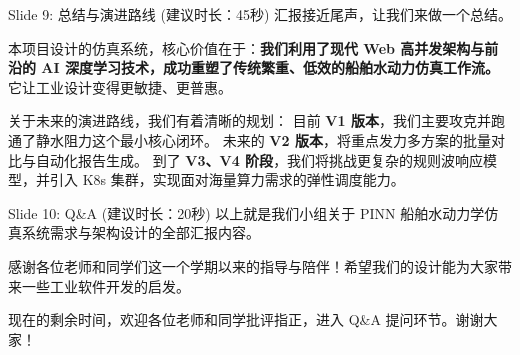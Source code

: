 \documentclass[UTF8,11pt]{ctexart}
\begin{document}
\begin{slidebox}{Slide 9: 总结与演进路线 (建议时长：45秒)}
汇报接近尾声，让我们来做一个总结。

本项目设计的仿真系统，核心价值在于：\textbf{我们利用了现代 Web 高并发架构与前沿的 AI 深度学习技术，成功重塑了传统繁重、低效的船舶水动力仿真工作流。} 它让工业设计变得更敏捷、更普惠。

关于未来的演进路线，我们有着清晰的规划：
目前 \textbf{V1 版本}，我们主要攻克并跑通了静水阻力这个最小核心闭环。
未来的 \textbf{V2 版本}，将重点发力多方案的批量对比与自动化报告生成。
到了 \textbf{V3、V4 阶段}，我们将挑战更复杂的规则波响应模型，并引入 K8s 集群，实现面对海量算力需求的弹性调度能力。
\end{slidebox}

\begin{slidebox}{Slide 10: Q\&A (建议时长：20秒)}
以上就是我们小组关于 PINN 船舶水动力学仿真系统需求与架构设计的全部汇报内容。

感谢各位老师和同学们这一个学期以来的指导与陪伴！希望我们的设计能为大家带来一些工业软件开发的启发。

现在的剩余时间，欢迎各位老师和同学批评指正，进入 Q\&A 提问环节。谢谢大家！
\end{slidebox}
\end{document}

